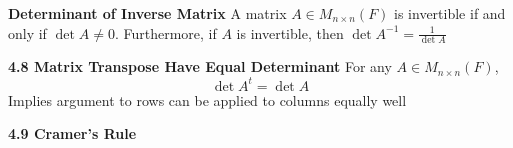 \documentclass[11pt]{article}
\begin{document}
\begin{corollary*}
    \textbf{Determinant of Inverse Matrix} A matrix $A\in M_{n\times n}(F)$ is invertible if and only if $\det{A}\neq 0$. Furthermore, if $A$ is invertible, then $\det{A^{-1}} = \frac{1}{\det{A}}$
\end{corollary*}

\begin{theorem*}
    \textbf{4.8 Matrix Transpose Have Equal Determinant} For any $A\in M_{n\times n}(F)$, 
    \[
        \det{A^t} = \det{A}    
    \]
    Implies argument to rows can be applied to columns equally well
\end{theorem*}



\begin{theorem*}
    \textbf{4.9 Cramer's Rule} 
\end{theorem*}
\end{document}
